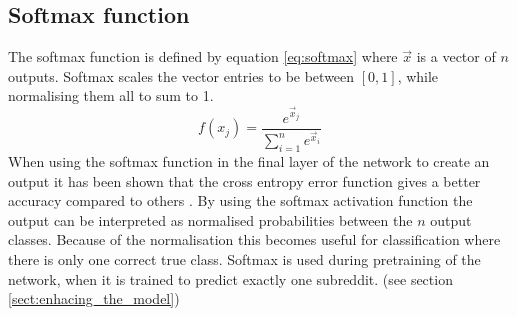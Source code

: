 \subsection{Softmax function}\label{sec:softmax_function}
The softmax function is defined by equation \ref{eq:softmax} where $\vec{x}$ is a vector of $n$ outputs. Softmax scales the vector entries to be between $[0,1]$, while normalising them all to sum to 1.
\begin{equation} \label{eq:softmax}
    f(x_j) = \frac{e^{\vec{x}_j}}{\sum_{i=1}^{n} e^{\vec{x}_i}}
\end{equation}
When using the softmax function in the final layer of the network to create an output it has been shown that the cross entropy error function gives a better accuracy compared to others \parencite{dunne1997pairing,golik2013cross}. By using the softmax activation function the output can be interpreted as normalised probabilities between the $n$ output classes. Because of the normalisation this becomes useful for classification where there is only one correct true class. Softmax is used during pretraining of the network, when it is trained to predict exactly one subreddit. (see section \ref{sect:enhacing_the_model})

